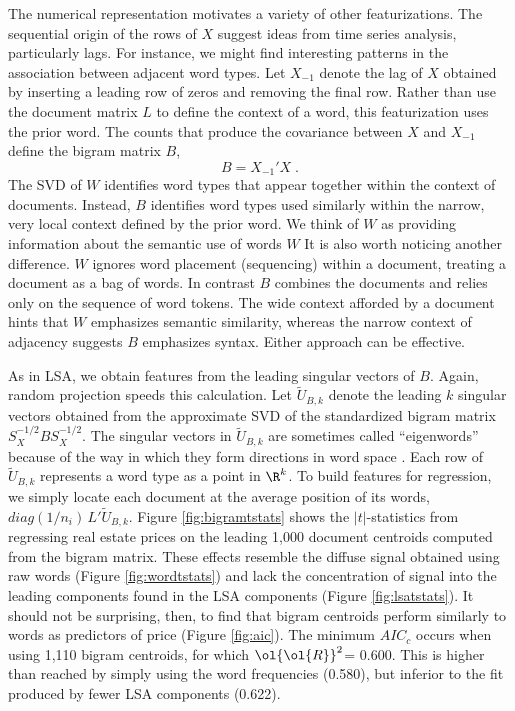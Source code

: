 \documentclass[12pt]{article}
\newcommand{\prs}{\mbox{$\ol{\ol{R}}^2$}}
\begin{document}
The numerical representation  motivates a variety of other featurizations.  The sequential origin of the rows of $X$ suggest ideas from time series analysis, particularly lags.  For instance, we might find interesting patterns in the association between adjacent word types.  Let $X_{-1}$ denote the lag of $X$ obtained by inserting a leading row of zeros and removing the final row.  Rather than use the document matrix $L$ to define the context of a word, this featurization uses the prior word.  The counts that produce the covariance between $X$ and $X_{-1}$ define the bigram matrix $B$,
 \begin{equation}
   B = X_{-1}' X   \;.
\end{equation}
The SVD of $W$ identifies word types that appear together within the context of documents.  Instead, $B$ identifies word types used similarly within the narrow, very local context defined by the prior word. We think of $W$ as providing information about the semantic use of words $W$ It is also worth noticing another difference.  $W$ ignores word placement (sequencing) within a document, treating a document as a bag of words.  In contrast $B$ combines the documents and relies only on the sequence of word tokens. The wide context afforded by a document hints that $W$ emphasizes semantic similarity, whereas the narrow context of adjacency suggests $B$ emphasizes syntax.  Either approach can be effective.

 
As in LSA, we obtain features from the leading singular vectors of $B$.  Again, random projection speeds this calculation.  Let $\widetilde{U}_{B,k}$ denote the leading $k$ singular vectors obtained from the approximate SVD of the standardized bigram matrix $S_X^{-1/2} B S_X^{-1/2}$.  The singular vectors in $\widetilde{U}_{B,k}$ are sometimes called ``eigenwords'' because of the way in which they form directions in word space .  Each row of $\widetilde{U}_{B,k}$ represents a word type as a point in $\R^k$.   To build features for regression, we simply locate each document at the average position of its words, $diag(1/n_i)\,L'\widetilde{U}_{B,k}$.
Figure \ref{fig:bigramtstats} shows the $|t|$-statistics from regressing real estate prices on the leading 1,000 document centroids computed from the bigram matrix.  These effects resemble the diffuse signal obtained using raw words (Figure \ref{fig:wordtstats}) and lack the concentration of signal into the leading components found in the LSA components (Figure \ref{fig:lsatstats}).  It should not be surprising, then, to find that bigram centroids perform similarly to words as predictors of price (Figure \ref{fig:aic}).  The minimum $AIC_c$ occurs when using 1,110 bigram centroids, for which \prs = 0.600.  This is higher than reached by simply using the word frequencies (0.580), but inferior to the fit produced by fewer LSA components (0.622).
\end{document}
